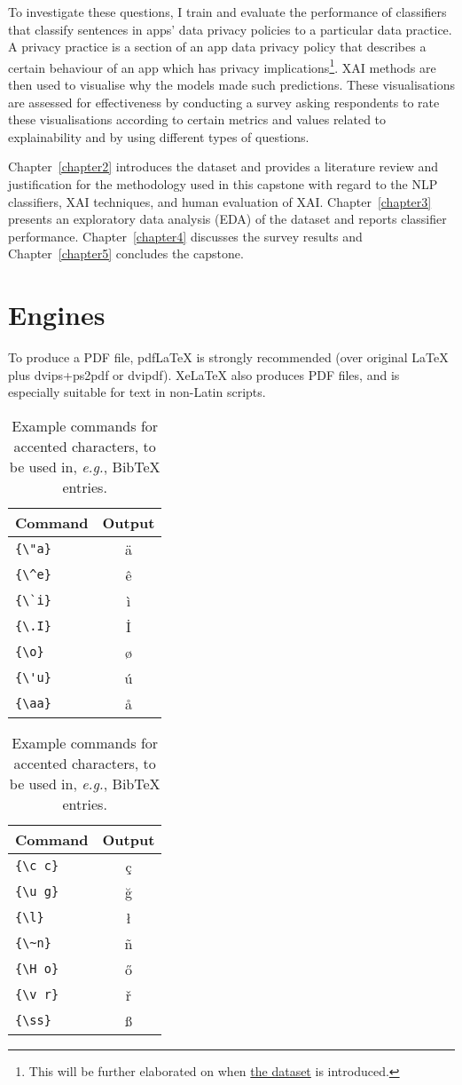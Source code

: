 \documentclass[11pt]{article}
\begin{document}
To investigate these questions, I train and evaluate the performance of classifiers that classify sentences in apps' data privacy policies to a particular data practice. A privacy practice is a section of an app data privacy policy that describes a certain behaviour of an app which has privacy implications\footnote{This will be further elaborated on when \hyperref[app350_corpus]{the dataset} is introduced.}. XAI methods are then used to visualise why the models made such predictions. These visualisations are assessed for effectiveness by conducting a survey asking respondents to rate these visualisations according to certain metrics and values related to explainability and by using different types of questions.

Chapter~\ref{chapter2} introduces the dataset and provides a literature review and justification for the methodology used in this capstone with regard to the NLP classifiers, XAI techniques, and human evaluation of XAI. Chapter~\ref{chapter3} presents an exploratory data analysis (EDA) of the dataset and reports classifier performance. Chapter~\ref{chapter4} discusses the survey results and Chapter~\ref{chapter5} concludes the capstone.



\section{Engines}

To produce a PDF file, pdf\LaTeX{} is strongly recommended (over original \LaTeX{} plus dvips+ps2pdf or dvipdf). Xe\LaTeX{} also produces PDF files, and is especially suitable for text in non-Latin scripts.
\begin{table}
\centering
\begin{tabular}{lc}
\hline
\textbf{Command} & \textbf{Output}\\
\hline
\verb|{\"a}| & {\"a} \\
\verb|{\^e}| & {\^e} \\
\verb|{\`i}| & {\`i} \\ 
\verb|{\.I}| & {\.I} \\ 
\verb|{\o}| & {\o} \\
\verb|{\'u}| & {\'u}  \\ 
\verb|{\aa}| & {\aa}  \\\hline
\end{tabular}
\begin{tabular}{lc}
\hline
\textbf{Command} & \textbf{Output}\\
\hline
\verb|{\c c}| & {\c c} \\ 
\verb|{\u g}| & {\u g} \\ 
\verb|{\l}| & {\l} \\ 
\verb|{\~n}| & {\~n} \\ 
\verb|{\H o}| & {\H o} \\ 
\verb|{\v r}| & {\v r} \\ 
\verb|{\ss}| & {\ss} \\
\hline
\end{tabular}
\caption{Example commands for accented characters, to be used in, \emph{e.g.}, Bib\TeX{} entries.}
\label{tab:accents}
\end{table}
\end{document}
